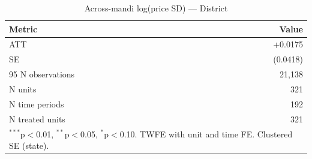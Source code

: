 \begin{table}[htbp]
\centering
\caption{Across-mandi log(price SD) — District}
\label{tab:spec2_across_district_pooled}
\begin{tabular}{lr}
\hline\hline
Metric & Value \\
\hline
ATT & +0.0175 \\
SE & (0.0418) \\
95%
N observations & 21,138 \\
N units & 321 \\
N time periods & 192 \\
N treated units & 321 \\
\hline\hline
\multicolumn{2}{l}{\footnotesize $^{***}$p$<$0.01, $^{**}$p$<$0.05, $^{*}$p$<$0.10. TWFE with unit and time FE. Clustered SE (state).} \\
\end{tabular}
\end{table}
